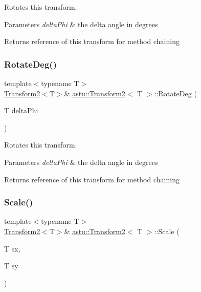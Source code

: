 Rotates this transform.


\begin{DoxyParams}{Parameters}
{\em delta\+Phi} & the delta angle in degrees \\
\hline
\end{DoxyParams}
\begin{DoxyReturn}{Returns}
reference of this transform for method chaining 
\end{DoxyReturn}
\mbox{\label{classastu_1_1Transform2_a556a2918222c36c8e47735640b2335f8}} 
\subsubsection{\texorpdfstring{Rotate\+Deg()}{RotateDeg()}}
{\footnotesize\ttfamily template$<$typename T$>$ \\
\hyperlink{classastu_1_1Transform2}{Transform2}$<$T$>$\& \hyperlink{classastu_1_1Transform2}{astu\+::\+Transform2}$<$ T $>$\+::Rotate\+Deg (\begin{DoxyParamCaption}\item[{T}]{delta\+Phi }\end{DoxyParamCaption})\hspace{0.3cm}{\ttfamily [inline]}}

Rotates this transform.


\begin{DoxyParams}{Parameters}
{\em delta\+Phi} & the delta angle in degrees \\
\hline
\end{DoxyParams}
\begin{DoxyReturn}{Returns}
reference of this transform for method chaining 
\end{DoxyReturn}
\mbox{\label{classastu_1_1Transform2_a0751a24e9f7240bf5e0e9232e50ff98c}} 
\subsubsection{\texorpdfstring{Scale()}{Scale()}\hspace{0.1cm}{\footnotesize\ttfamily [1/2]}}
{\footnotesize\ttfamily template$<$typename T$>$ \\
\hyperlink{classastu_1_1Transform2}{Transform2}$<$T$>$\& \hyperlink{classastu_1_1Transform2}{astu\+::\+Transform2}$<$ T $>$\+::Scale (\begin{DoxyParamCaption}\item[{T}]{sx,  }\item[{T}]{sy }\end{DoxyParamCaption})\hspace{0.3cm}{\ttfamily [inline]}}

